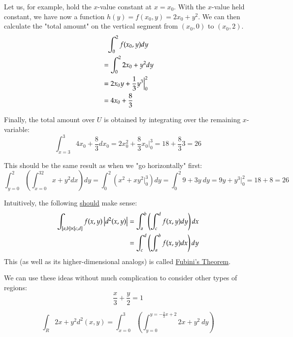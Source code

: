 \begin{center}
\end{center}
Let us, for example, hold the $x$-value constant at $x=x_0$. With the $x$-value held constant, we have now a function $h(y)=f(x_0,y)=2x_0+y^2$. We can then calculate the "total amount" on the vertical segment from $(x_0,0)$ to $(x_0,2)$. 
\begin{align*}
	&\hphantom{=}\int_0^2 f(x_0,y) dy \\
	&= \int_0^2 2x_0 + y^2 dy \\
	&= 2x_0y+\frac{1}{3}y^3 \Bigr\rvert_0^2 \\
	&= 4x_0+\frac{8}{3}
\end{align*}

Finally, the total amount over $U$ is obtained by integrating over the remaining $x$-variable: 
\[\int_{x=3}^3 4x_0 + \frac{8}{3} dx_0 = 2x_0^2 + \frac{8}{3} x_0 \Bigr\rvert_0^3=18+\frac{8}{3}3=26\]

This should be the same result as when we "go horizontally" first: 
\[\int_{y=0}^2\left(\int_{x=0}^32x+y^2 dx\right)dy=\int_{0}^2\left(x^2+xy^2\Bigr\rvert_0^3\right)dy=\int_0^2 9+3y\ dy=9y+y^3 \Bigr\rvert_0^2 =18+8=26\]

Intuitively, the following \ul{should} make sense: 
\begin{align*}
	\int_{[a,b]\times[c,d]} f(x,y) \left| d^2(x,y)\right| &=\int_a^b\left( \int_c^d f(x,y) dy \right)dx \\
	&=\int_c^d\left( \int_a^b f(x,y) dx \right)dy
\end{align*}
This (as well as its higher-dimensional analogs) is called \ul{Fubini's Theorem}. 

We can use these ideas without much complication to consider other types of regions:
\[\frac{x}{3}+\frac{y}{2}=1\]
\begin{center}
\end{center}
\[\int_R 2x+y^2 d^2(x,y) = \int_{x=0}^3\left(\int_{y=0}^{y=-\frac{2}{3}x+2}2x+y^2\ dy\right)\]